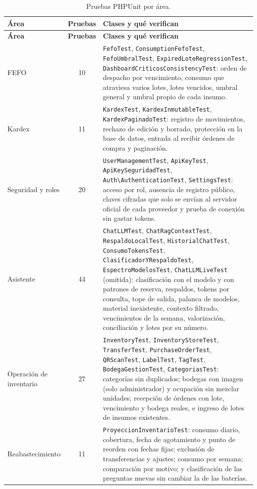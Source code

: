 \begin{longtable}{|p{3.4cm}|c|p{10cm}|}
\caption{Pruebas PHPUnit por área.}
\label{tab:pru_phpunit}\\
\hline
\textbf{Área} & \textbf{Pruebas} & \textbf{Clases y qué verifican} \\
\hline
\endfirsthead
\hline
\textbf{Área} & \textbf{Pruebas} & \textbf{Clases y qué verifican} \\
\hline
\endhead
FEFO & 10 & \texttt{FefoTest}, \texttt{ConsumptionFefoTest}, \texttt{FefoUmbralTest}, \texttt{ExpiredLoteRegressionTest}, \texttt{DashboardCriticosConsistencyTest}: orden de despacho por vencimiento, consumo que atraviesa varios lotes, lotes vencidos, umbral general y umbral propio de cada insumo. \\ \hline
Kardex & 11 & \texttt{KardexTest}, \texttt{KardexInmutableTest}, \texttt{KardexPaginadoTest}: registro de movimientos, rechazo de edición y borrado, protección en la base de datos, entrada al recibir órdenes de compra y paginación. \\ \hline
Seguridad y roles & 20 & \texttt{UserManagementTest}, \texttt{ApiKeyTest}, \texttt{ApiKeySeguridadTest}, \texttt{Auth\textbackslash AuthenticationTest}, \texttt{SettingsTest}: acceso por rol, ausencia de registro público, claves cifradas que solo se envían al servidor oficial de cada proveedor y prueba de conexión sin gastar tokens. \\ \hline
Asistente & 44 & \texttt{ChatLLMTest}, \texttt{ChatRagContextTest}, \texttt{RespaldoLocalTest}, \texttt{HistorialChatTest}, \texttt{ConsumoTokensTest}, \texttt{ClasificadorYRespaldoTest}, \texttt{EspectroModelosTest}, \texttt{ChatLLMLiveTest} (omitida): clasificación con el modelo y con patrones de reserva, respaldos, tokens por consulta, tope de salida, palanca de modelos, material inexistente, contexto filtrado, vencimientos de la semana, valorización, conciliación y lotes por su número. \\ \hline
Operación de inventario & 27 & \texttt{InventoryTest}, \texttt{InventoryStoreTest}, \texttt{TransferTest}, \texttt{PurchaseOrderTest}, \texttt{QRScanTest}, \texttt{LabelTest}, \texttt{TagTest}, \texttt{BodegaGestionTest}, \texttt{CategoriasTest}: categorías sin duplicados; bodegas con imagen (solo administrador) y ocupación sin mezclar unidades; recepción de órdenes con lote, vencimiento y bodega reales, e ingreso de lotes de insumos existentes. \\ \hline
Reabastecimiento & 11 & \texttt{ProyeccionInventarioTest}: consumo diario, cobertura, fecha de agotamiento y punto de reorden con fechas fijas; exclusión de transferencias y ajustes; consumo por semana; comparación por motivo; y clasificación de las preguntas nuevas sin cambiar la de las baterías. \\ \hline

\end{longtable}
